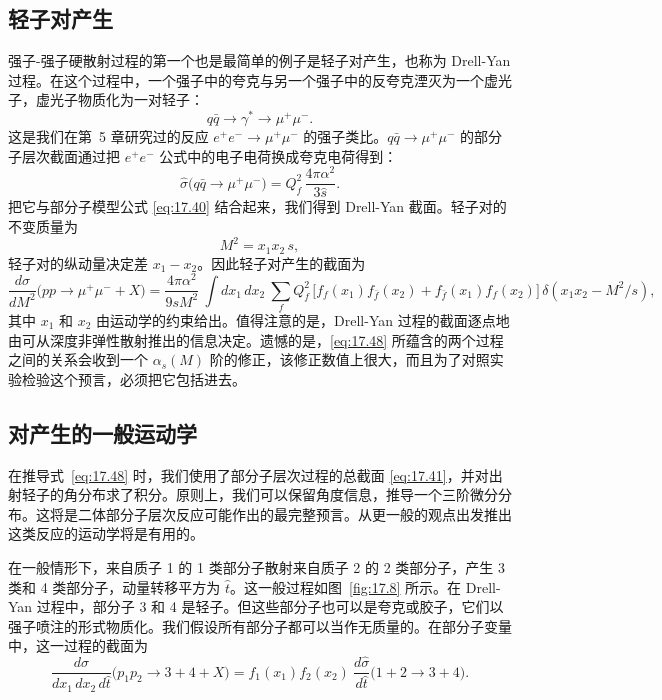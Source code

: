 \subsection{轻子对产生}

强子-强子硬散射过程的第一个也是最简单的例子是轻子对产生，也称为 Drell-Yan 过程。在这个过程中，一个强子中的夸克与另一个强子中的反夸克湮灭为一个虚光子，虚光子物质化为一对轻子：
\begin{equation}
  q\bar{q} \to \gamma^{*} \to \mu^{+}\mu^{-} .
\end{equation}
这是我们在第~5 章研究过的反应 $e^{+}e^{-}\to\mu^{+}\mu^{-}$ 的强子类比。$q\bar{q}\to\mu^{+}\mu^{-}$ 的部分子层次截面通过把 $e^{+}e^{-}$ 公式中的电子电荷换成夸克电荷得到：
\begin{equation}
  \hat{\sigma}\bigl( q\bar{q} \to \mu^{+}\mu^{-} \bigr)
  = Q_f^2\,\frac{4\pi\alpha^2}{3\hat{s}} .
  \label{eq:17.41}
\end{equation}
把它与部分子模型公式 \eqref{eq:17.40} 结合起来，我们得到 Drell-Yan 截面。轻子对的不变质量为
\begin{equation}
  M^2 = x_1x_2\,s ,
\end{equation}
轻子对的纵动量决定差 $x_1 - x_2$。因此轻子对产生的截面为
\begin{equation}
  \frac{d\sigma}{dM^2}\bigl( pp \to \mu^{+}\mu^{-} + X \bigr)
  = \frac{4\pi\alpha^2}{9sM^2}\ \int dx_1\,dx_2\ \sum_f Q_f^2\,
    \bigl[ f_f(x_1)f_{\bar{f}}(x_2) + f_{\bar{f}}(x_1)f_f(x_2) \bigr]\,
    \delta(x_1x_2 - M^2/s) ,
  \label{eq:17.48}
\end{equation}
其中 $x_1$ 和 $x_2$ 由运动学的约束给出。值得注意的是，Drell-Yan 过程的截面逐点地由可从深度非弹性散射推出的信息决定。遗憾的是，\eqref{eq:17.48} 所蕴含的两个过程之间的关系会收到一个 $\alpha_s(M)$ 阶的修正，该修正数值上很大，而且为了对照实验检验这个预言，必须把它包括进去。

\subsection{对产生的一般运动学}

在推导式~\eqref{eq:17.48} 时，我们使用了部分子层次过程的总截面 \eqref{eq:17.41}，并对出射轻子的角分布求了积分。原则上，我们可以保留角度信息，推导一个三阶微分分布。这将是二体部分子层次反应可能作出的最完整预言。从更一般的观点出发推出这类反应的运动学将是有用的。

在一般情形下，来自质子 1 的 1 类部分子散射来自质子 2 的 2 类部分子，产生 3 类和 4 类部分子，动量转移平方为 $\hat{t}$。这一般过程如图~\ref{fig:17.8} 所示。在 Drell-Yan 过程中，部分子 3 和 4 是轻子。但这些部分子也可以是夸克或胶子，它们以强子喷注的形式物质化。我们假设所有部分子都可以当作无质量的。在部分子变量中，这一过程的截面为
\begin{equation}
  \frac{d\sigma}{dx_1\,dx_2\,d\hat{t}}\bigl( p_1p_2 \to 3 + 4 + X \bigr)
  = f_1(x_1)f_2(x_2)\ \frac{d\hat{\sigma}}{d\hat{t}}\bigl( 1 + 2 \to 3 + 4
    \bigr) .
  \label{eq:17.49}
\end{equation}

